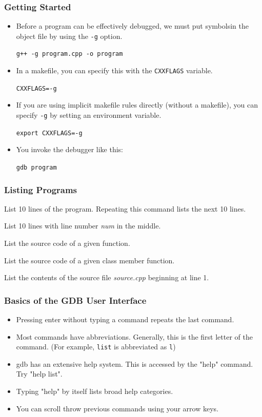 \documentclass{beamer}
\begin{document}
\begin{frame}
    \frametitle{Getting Started}
    \begin{itemize}[<+->]
       \item Before a program can be effectively debugged, we must put symbols\footnotemark in the object file by using the {\tt -g} option. 
           \par{\tt g++ -g program.cpp -o program}
       \item In a makefile, you can specify this with the
           {\tt CXXFLAGS} variable.
           \par{\tt CXXFLAGS=-g}
       \item If you are using implicit makefile rules directly (without a makefile), you can specify {\tt -g} by setting an environment variable.
           \par{\tt export CXXFLAGS=-g}
       \item You invoke the debugger like this:
           \par{\tt gdb program}
    \end{itemize}
\end{frame}

\begin{frame}
    \frametitle{Listing Programs}
    \begin{description}[<+->]
        \item[list] List 10 lines of the program.  Repeating this command lists the next 10 lines.
        \item[list {\it num}] List 10 lines with line number {\it num} in the middle.
        \item[list {\it function}] List the source code of a given function.
        \item[list {\it classname}::{\it function}] List 
        the source code of a given class member function.
        \item[list {\it source.cpp}:1] List the contents of
        the source file {\it source.cpp} beginning at line 1.
    \end{description}
\end{frame}

\begin{frame}
    \frametitle{Basics of the GDB User Interface}
    \begin{itemize}[<+->]
        \item Pressing enter without typing a command repeats the last command. 
        \item Most commands have abbreviations.  Generally, this is the first letter of the command. (For example, {\tt list} is abbreviated as {\tt l})
        \item gdb has an extensive help system.  This is accessed by the "help" command.  Try "help list".
        \item Typing "help" by itself lists broad help categories.
        \item You can scroll throw previous commands using your arrow keys.
    \end{itemize}
\end{frame}
\end{document}
